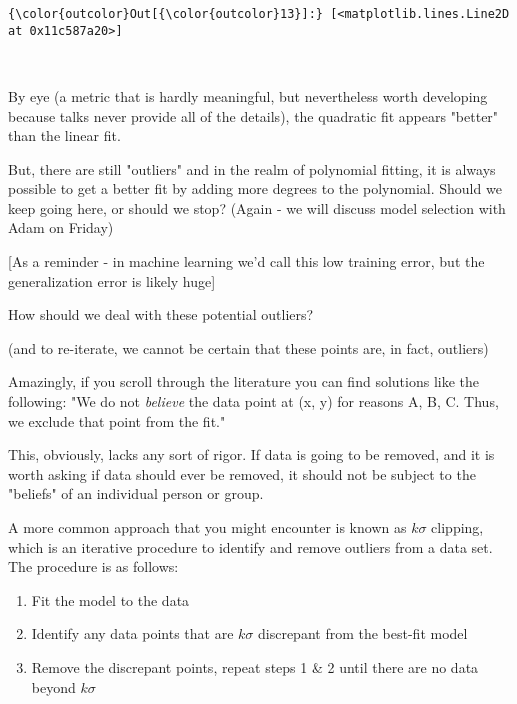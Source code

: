 \documentclass[11pt]{article}
\providecommand{\tightlist}{%
      \setlength{\itemsep}{0pt}\setlength{\parskip}{0pt}}
\begin{document}
\begin{Verbatim}[commandchars=\\\{\}]
{\color{outcolor}Out[{\color{outcolor}13}]:} [<matplotlib.lines.Line2D at 0x11c587a20>]
\end{Verbatim}
            
    \begin{center}
    \end{center}
    { \hspace*{\fill} \\}
    
    By eye (a metric that is hardly meaningful, but nevertheless worth
developing because talks never provide all of the details), the
quadratic fit appears "better" than the linear fit.

But, there are still "outliers" and in the realm of polynomial fitting,
it is always possible to get a better fit by adding more degrees to the
polynomial. Should we keep going here, or should we stop? (Again - we
will discuss model selection with Adam on Friday)

{[}As a reminder - in machine learning we'd call this low training
error, but the generalization error is likely huge{]}

    How should we deal with these potential outliers?

(and to re-iterate, we cannot be certain that these points are, in fact,
outliers)

    Amazingly, if you scroll through the literature you can find solutions
like the following: "We do not \emph{believe} the data point at (x, y)
for reasons A, B, C. Thus, we exclude that point from the fit."

This, obviously, lacks any sort of rigor. If data is going to be
removed, and it is worth asking if data should ever be removed, it
should not be subject to the "beliefs" of an individual person or group.

    A more common approach that you might encounter is known as \(k\sigma\)
clipping, which is an iterative procedure to identify and remove
outliers from a data set. The procedure is as follows:

\begin{enumerate}
\def\labelenumi{\arabic{enumi}.}
\tightlist
\item
  Fit the model to the data
\item
  Identify any data points that are \(k\sigma\) discrepant from the
  best-fit model
\item
  Remove the discrepant points, repeat steps 1 \& 2 until there are no
  data beyond \(k\sigma\)
\end{enumerate}
\end{document}
